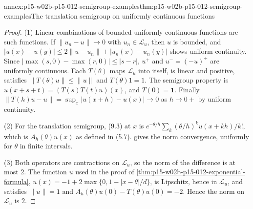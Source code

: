 \begin{annexitem}{annex:p15-w02b-p15-012-semigroup-examples}{thm:p15-w02b-p15-012-semigroup-examples}{The translation semigroup on uniformly continuous functions}
\begin{proof}
(1) Linear combinations of bounded uniformly continuous functions are such
functions. If \(\|u_n-u\|\to0\) with \(u_n\in\mathscr L_u\), then \(u\) is
bounded, and \(|u(x)-u(y)|\leq2\|u-u_n\|+|u_n(x)-u_n(y)|\) shows uniform
continuity. Since \(|\max(s,0)-\max(r,0)|\leq|s-r|\), \(u^+\) and
\(u^-=(-u)^+\) are uniformly continuous. Each \(T(\theta)\) maps
\(\mathscr L_u\) into itself, is linear and positive, satisfies
\(\|T(\theta)u\|\leq\|u\|\) and \(T(\theta)1=1\). The semigroup property is
\(u(x+s+t)=(T(s)T(t)u)(x)\), and \(T(0)=\mathbf 1\). Finally
\(\|T(h)u-u\|=\sup_x|u(x+h)-u(x)|\to0\) as \(h\to0+\) by uniform continuity.

(2) For the translation semigroup, (9.3) at \(x\) is
\(e^{-\theta/h}\sum_k(\theta/h)^ku(x+kh)/k!\), which is \(A_h(\theta)u(x)\) as
defined in (5.7).  gives the
norm convergence, uniformly for \(\theta\) in finite intervals.

(3) Both operators are contractions on \(\mathscr L_u\), so the norm of the
difference is at most \(2\). The function \(u\) used in the proof of
\cref{thm:p15-w02b-p15-012-exponential-formula},
\(u(x)=-1+2\max\{0,1-|x-\theta|/d\}\), is Lipschitz, hence in
\(\mathscr L_u\), and satisfies \(\|u\|=1\) and
\(A_h(\theta)u(0)-T(\theta)u(0)=-2\). Hence the norm on \(\mathscr L_u\) is
\(2\).
\end{proof}
\end{annexitem}

